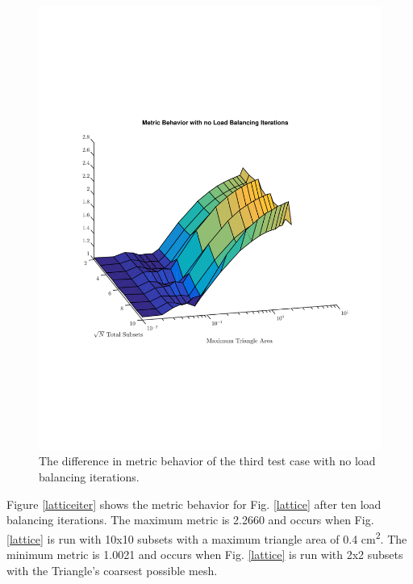 \documentclass{anstrans}
\begin{document}
\begin{figure}
\centering
\includegraphics[scale=0.5, trim = 0cm 5cm 0cm 5cm,clip]{figures/lattice_no_iter.pdf}
\caption{The difference in metric behavior of the third test case with no load balancing iterations.}
\label{latticenoiter}
\end{figure}

Figure \ref{latticeiter} shows the metric behavior for Fig. \ref{lattice} after ten load balancing iterations. The maximum metric is 2.2660 and occurs when Fig. \ref{lattice} is run with 10x10 subsets with a maximum triangle area of 0.4 cm\textsuperscript{2}. The minimum metric is 1.0021 and occurs when Fig. \ref{lattice} is run with 2x2 subsets with the Triangle's coarsest possible mesh.
\end{document}
